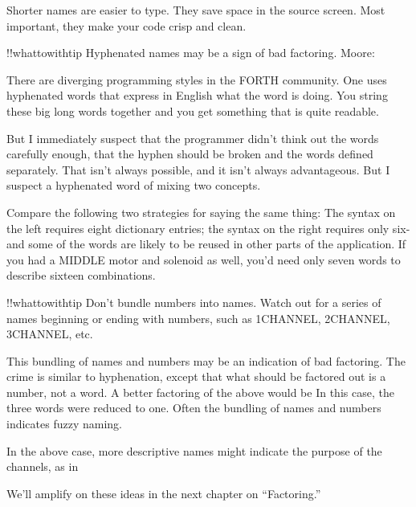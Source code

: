 Shorter names are easier to type.  They save space in the source
screen.  Most important, they make your code crisp and clean.

!!whattowithtip{
Hyphenated names may be a sign of bad factoring.
}
Moore:

There are diverging programming styles in the FORTH community.  One
uses hyphenated words that express in English what the word is doing.
You string these big long words together and you get something that is
quite readable.

But I immediately suspect that the programmer didn't think out the words
carefully enough, that the hyphen should be broken and the words defined
separately.  That isn't always possible, and it isn't always advantageous.
But I suspect a hyphenated word of mixing two concepts.

Compare the following two strategies for saying the same thing:
The syntax on the left requires eight dictionary entries; the syntax on the
right requires only six-and some of the words are likely to be reused in
other parts of the application.  If you had a MIDDLE motor and solenoid
as well, you'd need only seven words to describe sixteen combinations.

!!whattowithtip{
Don't bundle numbers into names.
}
Watch out for a series of names beginning or ending with numbers, such
as 1CHANNEL, 2CHANNEL, 3CHANNEL, etc.

This bundling of names and numbers may be an indication of bad
factoring.  The crime is similar to hyphenation, except that what should
be factored out is a number, not a word.  A better factoring of the above
would be
In this case, the three words were reduced to one.
Often the bundling of names and numbers indicates fuzzy naming.

In the above case, more descriptive names might indicate the purpose of
the channels, as in

We'll amplify on these ideas in the next chapter on ``Factoring.''

